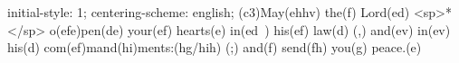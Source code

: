 initial-style: 1;
centering-scheme: english;
(c3)May(ehhv) the(f) Lord(ed) <sp>*</sp> o(efe)pen(de) your(ef) hearts(e) in(ed~) his(ef) law(d) (,) and(ev) in(ev) his(d) com(ef)mand(hi)ments:(hg/hih) (;) and(f) send(fh) you(g) peace.(e)
